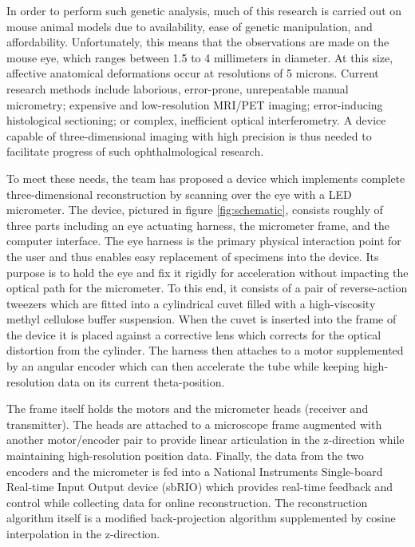 \documentclass{article}
\begin{document}
In order to perform such genetic analysis, much of this research is carried out on mouse animal models due to availability, ease of genetic manipulation, and affordability\cite{schaeffel04}. Unfortunately, this means that the observations are made on the mouse eye, which ranges between 1.5 to 4 millimeters in diameter. At this size, affective anatomical deformations occur at resolutions of 5 microns. Current research methods include laborious, error-prone, unrepeatable manual micrometry\cite{wallman04}; expensive and low-resolution MRI/PET imaging\cite{atchison04}; error-inducing histological sectioning\cite{schaeffel04}; or complex, inefficient optical interferometry\cite{guggenheim04,schaeffel04}. A device capable of three-dimensional imaging with high precision is thus needed to facilitate progress of such ophthalmological research.

To meet these needs, the team has proposed a device which implements complete three-dimensional reconstruction by scanning over the eye with a LED micrometer. The device, pictured in figure \ref{fig:schematic}, consists roughly of three parts including an eye actuating harness, the micrometer frame, and the computer interface. The eye harness is the primary physical interaction point for the user and thus enables easy replacement of specimens into the device. Its purpose is to hold the eye and fix it rigidly for acceleration without impacting the optical path for the micrometer. To this end, it consists of a pair of reverse-action tweezers which are fitted into a cylindrical cuvet filled with a high-viscosity methyl cellulose buffer suspension. When the cuvet is inserted into the frame of the device it is placed against a corrective lens which corrects for the optical distortion from the cylinder. The harness then attaches to a motor supplemented by an angular encoder which can then accelerate the tube while keeping high-resolution data on its current theta-position.

The frame itself holds the motors and the micrometer heads (receiver and transmitter). The heads are attached to a microscope frame augmented with another motor/encoder pair to provide linear articulation in the z-direction while maintaining high-resolution position data. Finally, the data from the two encoders and the micrometer is fed into a National Instruments Single-board Real-time Input Output device (sbRIO) which provides real-time feedback and control while collecting data for online reconstruction. The reconstruction algorithm itself is a modified back-projection algorithm supplemented by cosine interpolation in the z-direction.
\end{document}
